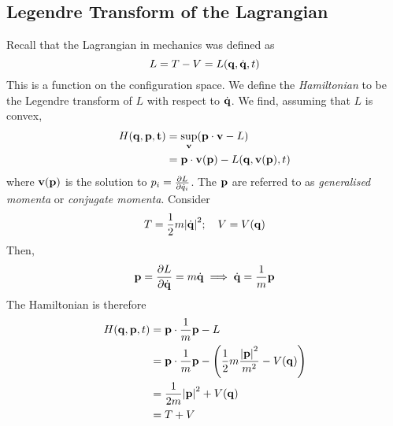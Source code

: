 \subsection{Legendre Transform of the Lagrangian}
Recall that the Lagrangian in mechanics was defined as
\[
	L = T - V = L(\vb q, \dot{\vb q}, t)
\]
This is a function on the configuration space.
We define the \textit{Hamiltonian} to be the Legendre transform of \( L \) with respect to \( \dot{\vb q} \).
We find, assuming that \( L \) is convex,
\begin{align*}
	H(\vb q, \vb p, \vb t) & = \sup_{\vb v} (\vb p \cdot \vb v - L)                 \\
	                       & = \vb p \cdot \vb v(\vb p) - L(\vb q, \vb v(\vb p), t)
\end{align*}
where \( \vb v(\vb p) \) is the solution to \( p_i = \pdv{L}{\dot{q}_i} \).
The \( \vb p \) are referred to as \textit{generalised momenta} or \textit{conjugate momenta}.
Consider
\[
	T = \frac{1}{2}m \abs{\dot{\vb q}}^2;\quad V = V(\vb q)
\]
Then,
\[
	\vb p = \pdv{L}{\dot{\vb q}} = m \dot{\vb q} \implies \dot{\vb q} = \frac{1}{m} \vb p
\]
The Hamiltonian is therefore
\begin{align*}
	H(\vb q, \vb p, t) & = \vb p \cdot \frac{1}{m} \vb p - L                                                       \\
	                   & = \vb p \cdot \frac{1}{m} \vb p - \qty(\frac{1}{2}m \frac{\abs{\vb p}^2}{m^2} - V(\vb q)) \\
	                   & = \frac{1}{2m} \abs{\vb p}^2 + V(\vb q)                                                   \\
	                   & = T + V
\end{align*}

